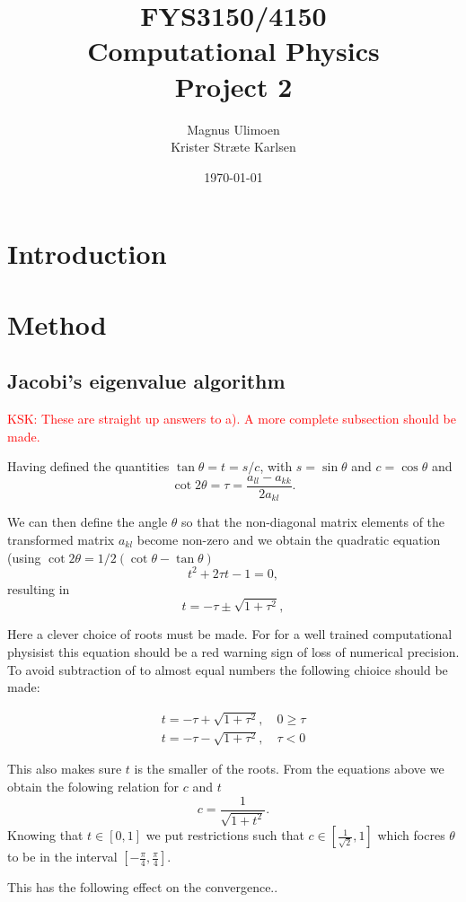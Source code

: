 \documentclass[11pt,a4paper,english]{article}
\title{FYS3150/4150\\Computational Physics\\Project 2}
\author{Magnus Ulimoen\\Krister Stræte Karlsen}
\date{\today}
\numberwithin{equation}{section}
\begin{document}
\maketitle

\section{Introduction}


\section{Method}

 
\subsection{Jacobi's eigenvalue algorithm}

\textcolor{red}{KSK: These are straight up answers to a). A more complete subsection should be made.}

Having defined the quantities $\tan\theta = t= s/c$, with $s=\sin\theta$ and $c=\cos\theta$ and
\[\cot 2\theta=\tau = \frac{a_{ll}-a_{kk}}{2a_{kl}}.
\]

We can then define the angle $\theta$ so that the non-diagonal matrix elements of the transformed matrix 
$a_{kl}$ become non-zero and
we obtain the quadratic equation (using $\cot 2\theta=1/2(\cot \theta-\tan\theta)$
\[
t^2+2\tau t-1= 0,
\]
resulting in 
\[
  t = -\tau \pm \sqrt{1+\tau^2},
\]

Here a clever choice of roots must be made. For for a well trained computational physisist this equation should be a red warning sign of loss of numerical precision. To avoid subtraction of to almost equal numbers the following chioice should be made:

\begin{align*}
t=  -\tau + \sqrt{1+\tau^2}, \quad   0  \geq \tau \\
t=  -\tau - \sqrt{1+\tau^2}, \quad   \tau <  0
\end{align*}

This also makes sure $t$ is the smaller of the roots. From the equations above we obtain the folowing relation for $c$ and $t$
\[
   c = \frac{1}{\sqrt{1+t^2}}.
\]
Knowing that $t \in [0,1]$ we put restrictions such that $c \in [\frac{1}{\sqrt{2}}, 1]$ which focres $\theta$ to be in the interval $[- \frac{\pi}{4},\frac{\pi}{4}]$.  

This has the following effect on the convergence.. 
\end{document}
